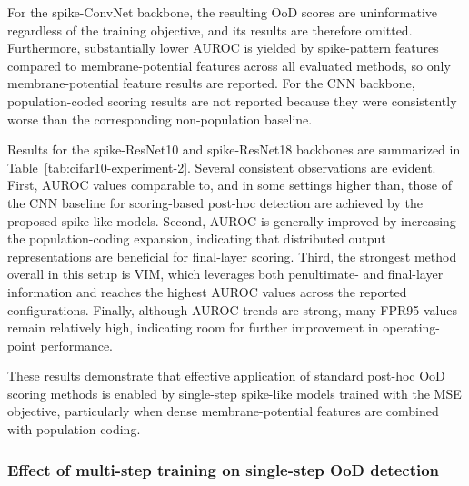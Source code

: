 \documentclass{ieeeaccess}
\begin{document}
For the spike-ConvNet backbone, the resulting OoD scores are uninformative regardless of the training objective, and its results are therefore omitted. Furthermore, substantially lower AUROC is yielded by spike-pattern features compared to membrane-potential features across all evaluated methods, so only membrane-potential feature results are reported. For the CNN backbone, population-coded scoring results are not reported because they were consistently worse than the corresponding non-population baseline.

Results for the spike-ResNet10 and spike-ResNet18 backbones are summarized in Table~\ref{tab:cifar10-experiment-2}. Several consistent observations are evident. First, AUROC values comparable to, and in some settings higher than, those of the CNN baseline for scoring-based post-hoc detection are achieved by the proposed spike-like models. Second, AUROC is generally improved by increasing the population-coding expansion, indicating that distributed output representations are beneficial for final-layer scoring. Third, the strongest method overall in this setup is VIM, which leverages both penultimate- and final-layer information and reaches the highest AUROC values across the reported configurations. Finally, although AUROC trends are strong, many FPR95 values remain relatively high, indicating room for further improvement in operating-point performance.

These results demonstrate that effective application of standard post-hoc OoD scoring methods is enabled by single-step spike-like models trained with the MSE objective, particularly when dense membrane-potential features are combined with population coding.


\subsubsection*{Effect of multi-step training on single-step OoD detection}
\end{document}
